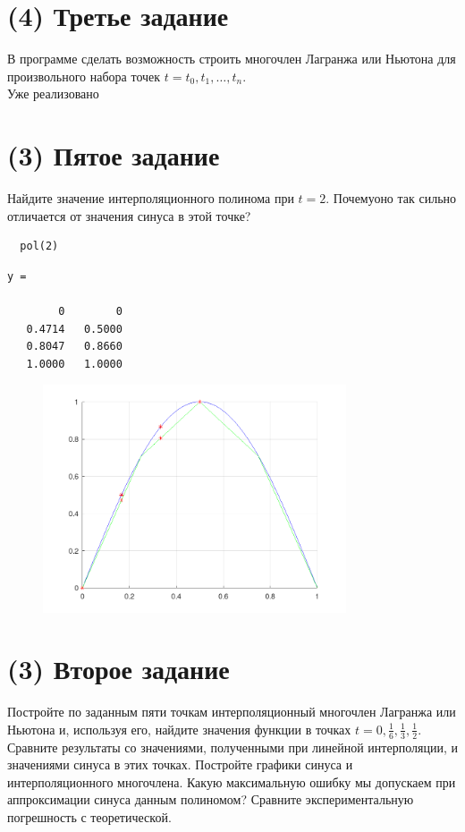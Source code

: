 \section{(4) Третье задание}
В программе сделать возможность строить многочлен Лагранжа или Ньютона для произвольного набора точек $t = t_{0}, t_{1}, \ldots, t_{n}$.\\[2mm]
Уже реализовано

\section{(3) Пятое задание}
Найдите значение интерполяционного полинома при $t = 2$. Почемуоно так сильно отличается от значения синуса в этой точке?\\[2mm]
\begin{lstlisting}
  pol(2)
\end{lstlisting}
\begin{lstlisting}[backgroundcolor=\color{cyan}]
  y =

        0        0
   0.4714   0.5000
   0.8047   0.8660
   1.0000   1.0000
 \end{lstlisting}

\begin{figure}[h]
  \centering
  \includegraphics[width=0.8\textwidth]{images/first_task_1.png}
\end{figure}

\section{(3) Второе задание}
Постройте по заданным пяти точкам интерполяционный многочлен Лагранжа или Ньютона и, используя его, найдите значения функции в точках $t =0, \frac{1}{6}, \frac{1}{3}, \frac{1}{2}$. Сравните результаты со значениями, полученными при линейной интерполяции, и значениями синуса в этих точках. Постройте графики синуса и интерполяционного многочлена. Какую максимальную ошибку мы допускаем при аппроксимации синуса данным полиномом? Сравните экспериментальную погрешность с теоретической.\\[2mm]

